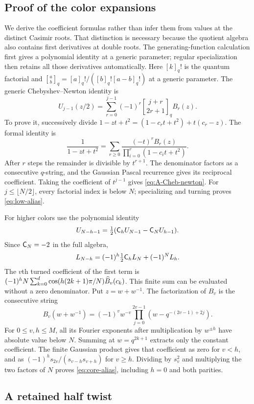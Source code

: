 \subsection{Proof of the color expansions}
We derive the coefficient formulas rather than infer them from values at the distinct Casimir roots. That distinction is necessary because the quotient algebra also contains first derivatives at double roots. The generating-function calculation first gives a polynomial identity at a generic parameter; regular specialization then retains all those derivatives automatically.
Here $[k]_q!$ is the quantum factorial and $\genfrac{[}{]}{0pt}{}{a}{b}_q=[a]_q!/([b]_q![a-b]_q!)$ at a generic parameter. The generic Chebyshev--Newton identity is
\begin{equation}\label{eq:A-Cheb-newton}
 U_{j-1}(z/2)=\sum_{r=0}^{j-1}(-1)^r
 \genfrac{[}{]}{0pt}{}{j+r}{2r+1}_q B_r(z).
\end{equation}
To prove it, successively divide
$1-zt+t^2=(1-c_rt+t^2)+t(c_r-z)$. The formal identity is
\[
 \frac1{1-zt+t^2}
 =\sum_{r\ge0}\frac{(-t)^rB_r(z)}{\prod_{i=0}^{r}(1-c_it+t^2)}.
\]
After $r$ steps the remainder is divisible by $t^{r+1}$. The denominator factors as a consecutive $q$-string, and the Gaussian Pascal recurrence gives its reciprocal coefficient. Taking the coefficient of $t^{j-1}$ gives \eqref{eq:A-Cheb-newton}. For $j\le\lfloor N/2\rfloor$, every factorial index is below $N$; specializing and turning proves \eqref{eq:low-alias}.

For higher colors use the polynomial identity
\[
 U_{N-h-1}=\tfrac12(\mathsf C_hU_{N-1}-\mathsf C_NU_{h-1}).
\]
Since $\mathsf C_N=-2$ in the full algebra,
\[
 L_{N-h}=(-1)^h\tfrac12\mathsf C_hL_N+(-1)^NL_h.
\]
The $v$th turned coefficient of the first term is
$(-1)^hN\sum_{k=0}^{d}\cos(h(2k+1)\pi/N)\widehat B_v(c_k)$.
This finite sum can be evaluated without a zero denominator. Put $z=w+w^{-1}$. The factorization of $B_v$ is the consecutive string
\[
 B_v(w+w^{-1})=(-1)^vw^{-v}
 \prod_{j=0}^{2v-1}\left(w-q^{-(2v-1)+2j}\right).
\]
For $0\le v,h\le M$, all its Fourier exponents after multiplication by $w^{\pm h}$ have absolute value below $N$. Summing at $w=q^{2k+1}$ extracts only the constant coefficient. The finite Gaussian product gives that coefficient as zero for $v<h$, and as
$(-1)^h s_{2v}/(s_{v-h}s_{v+h})$ for $v\ge h$. Dividing by $s_v^2$ and multiplying the two factors of $N$ proves \eqref{eq:core-alias}, including $h=0$ and both parities.


\subsection{A retained half twist}

